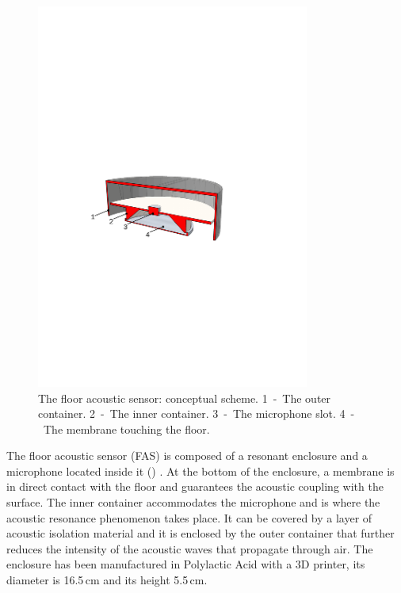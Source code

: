 \begin{figure}[t]
	\centering
	\includegraphics[width=0.8\textwidth]{img/AcousticSensor.pdf}
	\caption{The floor acoustic sensor: conceptual scheme. \mbox{1 - The} outer container. \mbox{2 - The} inner container. \mbox{3 - The} microphone slot. \mbox{4 - The} membrane touching the floor.}
	\label{fig:case}
\end{figure}
The floor acoustic sensor (FAS) is composed of a resonant enclosure and a microphone located inside it () \cite{Olivetti15}. At the bottom of  the enclosure, a membrane  is in direct contact with the floor and guarantees the acoustic coupling with the surface. The inner container accommodates the microphone and is where the acoustic resonance phenomenon takes place. It can be covered by a layer of acoustic isolation material and it is enclosed by the outer container that further reduces the intensity of the acoustic waves that propagate through air. The enclosure has been manufactured in Polylactic Acid with a 3D printer, its diameter is 16.5\,cm and its height 5.5\,cm.


